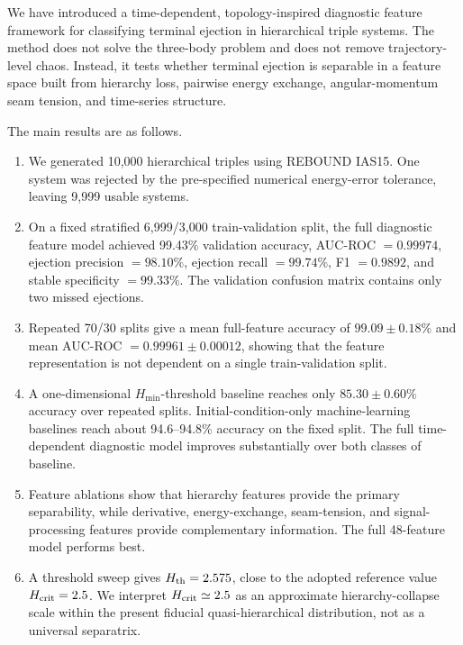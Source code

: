 \documentclass[12pt,a4paper]{article}
\newcommand{\Hcrit}{H_{\rm crit}}
\newcommand{\Hmin}{H_{\min}}
\begin{document}
We have introduced a time-dependent, topology-inspired diagnostic feature framework for classifying terminal ejection in hierarchical triple systems. The method does not solve the three-body problem and does not remove trajectory-level chaos. Instead, it tests whether terminal ejection is separable in a feature space built from hierarchy loss, pairwise energy exchange, angular-momentum seam tension, and time-series structure.

The main results are as follows.

\begin{enumerate}[label=(\roman*)]
    \item We generated 10,000 hierarchical triples using REBOUND IAS15. One system was rejected by the pre-specified numerical energy-error tolerance, leaving 9,999 usable systems.
    
    \item On a fixed stratified 6,999/3,000 train-validation split, the full diagnostic feature model achieved 99.43\% validation accuracy, AUC-ROC \(=0.99974\), ejection precision \(=98.10\%\), ejection recall \(=99.74\%\), F1 \(=0.9892\), and stable specificity \(=99.33\%\). The validation confusion matrix contains only two missed ejections.
    
    \item Repeated 70/30 splits give a mean full-feature accuracy of \(99.09\pm0.18\%\) and mean AUC-ROC \(=0.99961\pm0.00012\), showing that the feature representation is not dependent on a single train-validation split.
    
    \item A one-dimensional \(\Hmin\)-threshold baseline reaches only \(85.30\pm0.60\%\) accuracy over repeated splits. Initial-condition-only machine-learning baselines reach about 94.6--94.8\% accuracy on the fixed split. The full time-dependent diagnostic model improves substantially over both classes of baseline.
    
    \item Feature ablations show that hierarchy features provide the primary separability, while derivative, energy-exchange, seam-tension, and signal-processing features provide complementary information. The full 48-feature model performs best.
    
    \item A threshold sweep gives \(H_{\rm th}=2.575\), close to the adopted reference value \(\Hcrit=2.5\). We interpret \(\Hcrit\simeq2.5\) as an approximate hierarchy-collapse scale within the present fiducial quasi-hierarchical distribution, not as a universal separatrix.
\end{enumerate}
\end{document}

